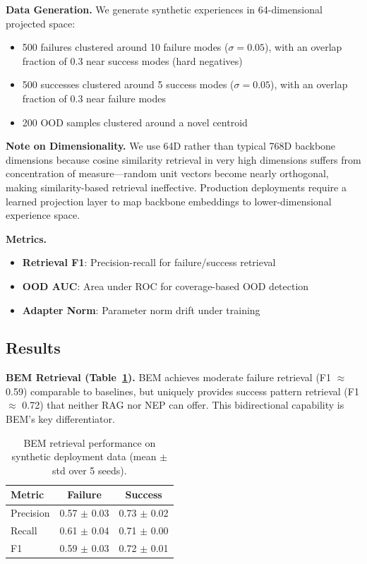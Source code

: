 \documentclass[twoside,11pt]{article}
\begin{document}
\textbf{Data Generation.} We generate synthetic experiences in 64-dimensional projected space:
\begin{itemize}
    \item 500 failures clustered around 10 failure modes ($\sigma = 0.05$), with an overlap fraction of 0.3 near success modes (hard negatives)
    \item 500 successes clustered around 5 success modes ($\sigma = 0.05$), with an overlap fraction of 0.3 near failure modes
    \item 200 OOD samples clustered around a novel centroid
\end{itemize}

\textbf{Note on Dimensionality.} We use 64D rather than typical 768D backbone dimensions because cosine similarity retrieval in very high dimensions suffers from concentration of measure---random unit vectors become nearly orthogonal, making similarity-based retrieval ineffective. Production deployments require a learned projection layer to map backbone embeddings to lower-dimensional experience space.

\textbf{Metrics.}
\begin{itemize}
    \item \textbf{Retrieval F1}: Precision-recall for failure/success retrieval
    \item \textbf{OOD AUC}: Area under ROC for coverage-based OOD detection
    \item \textbf{Adapter Norm}: Parameter norm drift under training
\end{itemize}

\subsection{Results}

\textbf{BEM Retrieval (Table~\ref{tab:retrieval}).} BEM achieves moderate failure retrieval (F1 $\approx$ 0.59) comparable to baselines, but uniquely provides success pattern retrieval (F1 $\approx$ 0.72) that neither RAG nor NEP can offer. This bidirectional capability is BEM's key differentiator.

\begin{table}[t]
\centering
\caption{BEM retrieval performance on synthetic deployment data (mean $\pm$ std over 5 seeds).}
\label{tab:retrieval}
\begin{tabular}{lcc}
\toprule
\textbf{Metric} & \textbf{Failure} & \textbf{Success} \\
\midrule
Precision & 0.57 $\pm$ 0.03 & 0.73 $\pm$ 0.02 \\
Recall & 0.61 $\pm$ 0.04 & 0.71 $\pm$ 0.00 \\
F1 & 0.59 $\pm$ 0.03 & 0.72 $\pm$ 0.01 \\
\bottomrule
\end{tabular}
\end{table}
\end{document}
